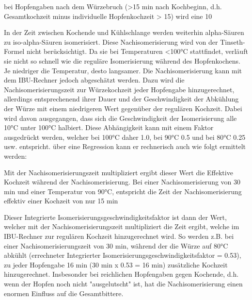 \documentclass[a4paper,parskip=half]{scrartcl}
\begin{document}
bei Hopfengaben nach dem Würzebruch (>15 min nach Kochbeginn, d.h. Gesamtkochzeit minus individuelle Hopfenkochzeit > 15) wird eine 10%

In der Zeit zwischen Kochende und Kühlschlange werden weiterhin alpha-Säuren zu iso-alpha-Säuren isomerisiert. Diese Nachisomerisierung wird von der Tinseth-Formel nicht berücksichtigt. Da sie bei Temperaturen <100°C stattfindet, verläuft sie nicht so schnell wie die reguläre Isomerisierung während des Hopfenkochens. Je niedriger die Temperatur, desto langsamer. Die Nachisomerisierung kann mit dem IBU-Rechner jedoch abgeschätzt werden. Dazu wird die Nachisomerisierungszeit zur Würzekochzeit jeder Hopfengabe hinzugerechnet, allerdings entsprechenend ihrer Dauer und der Geschwindigkeit der Abkühlung der Würze mit einem niedrigeren Wert gegenüber der regulären Kochzeit. Dabei wird davon ausgegangen, dass sich die Geschwindigkeit der Isomerisierung alle 10°C unter 100°C halbiert. Diese Abhängigkeit kann mit einem Faktor ausgedrückt werden, welcher bei 100°C daher 1.0, bei 90°C 0.5 und bei 80°C 0.25 usw. entspricht. über eine Regression kann er rechnerisch auch wie folgt ermittelt werden: 


Mit der Nachisomerisierungszeit multipliziert ergibt dieser Wert die Effektive Kochzeit während der Nachisomerisierung. Bei einer Nachisomerisierung von 30 min und einer Temperatur von 90°C, entspricht die Zeit der Nachisomerisierung effektiv einer Kochzeit von nur 15 min %


Dieser Integrierte Isomerisierungsgeschwindigkeitsfaktor ist dann der Wert, welcher mit der Nachisomerisierungszeit multipliziert die Zeit ergibt, welche im IBU-Rechner zur regulären Kochzeit hinzugerechnet wird. So werden z.B. bei einer Nachisomerisierungszeit von 30 min, während der die Würze auf 80°C abkühlt (errechneter Integrierter Isomerisierungsgeschwindigkeitsfaktor = 0.53), zu jeder Hopfengabe 16 min (30 min x 0.53 = 16 min) zusätzliche Kochzeit hinzugerechnet. Insbesonder bei reichlichen Hopfengaben gegen Kochende, d.h. wenn der Hopfen noch nicht "ausgelutscht" ist, hat die Nachisomerisierung einen enormen Einfluss auf die Gesamtbittere. 
\end{document}

